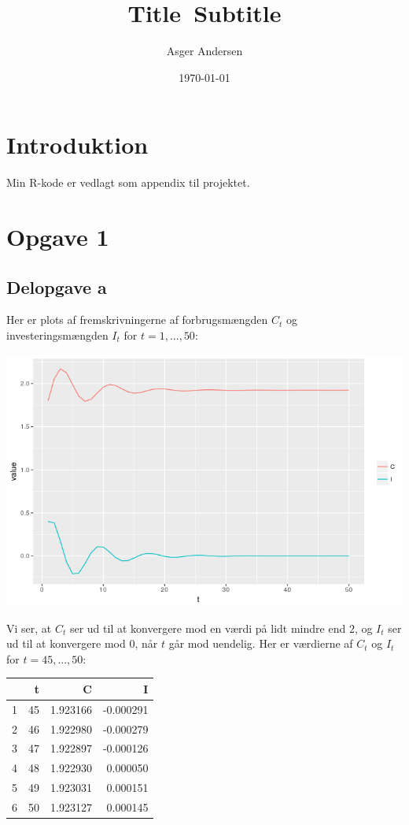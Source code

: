 \documentclass[12pt]{article}
\title{
  Title\
  \large Subtitle
}
\author{Asger Andersen}
\date{\today}
\begin{document}
\section*{Introduktion}

Min R-kode er vedlagt som appendix til projektet.

\section{Opgave 1}

\subsection{Delopgave a}

Her er plots af fremskrivningerne af forbrugsmængden $C_t$ og investeringsmængden $I_t$ for $t=1,...,50$:

\begin{center}
\includegraphics[scale=0.5]{q1p1.png}
\end{center}

Vi ser, at $C_t$ ser ud til at konvergere mod en værdi på lidt mindre end $2$, og $I_t$ ser ud til at konvergere mod $0$, når $t$ går mod uendelig. Her er værdierne af $C_t$ og $I_t$ for $t=45,...,50$:

\begin{table}[ht]
\centering
\begin{tabular}{rrrr}
  \hline
 & t & C & I \\ 
  \hline
1 &      45 & 1.923166 & -0.000291 \\ 
  2 &      46 & 1.922980 & -0.000279 \\ 
  3 &      47 & 1.922897 & -0.000126 \\ 
  4 &      48 & 1.922930 & 0.000050 \\ 
  5 &      49 & 1.923031 & 0.000151 \\ 
  6 &      50 & 1.923127 & 0.000145 \\ 
   \hline
\end{tabular}
\end{table}
\end{document}
